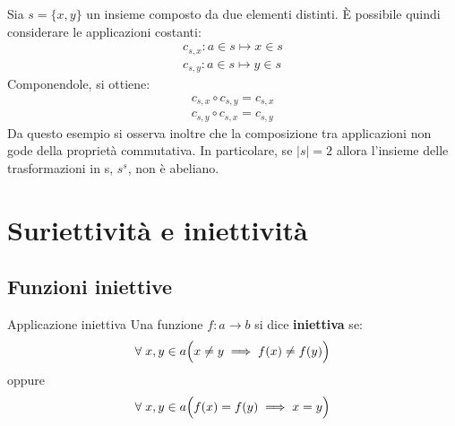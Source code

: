 \begin{osservation}\label{osservation:non_commutativity_composition}
	Sia $s=\{x,y\}$ un insieme composto da due elementi distinti. È possibile quindi considerare le applicazioni costanti:
	\begin{displaymath}
		\begin{array}{l}
			c_{s,x} : a \in s \mapsto x \in s \\
			c_{s,y} : a \in s \mapsto y \in s
		\end{array}
	\end{displaymath}
	Componendole, si ottiene:
	\begin{displaymath}
		\begin{array}{l}
			c_{s,x} \circ c_{s,y} = c_{s,x} \\
			c_{s,y} \circ c_{s,x} = c_{s,y}
		\end{array}
	\end{displaymath}
	Da questo esempio si osserva inoltre che la composizione tra applicazioni non gode della proprietà commutativa. In particolare, se $|s|=2$ allora l'insieme delle trasformazioni in s, $s^{s}$, non è abeliano.
\end{osservation}

\section{Suriettività e iniettività}
\subsection{Funzioni iniettive}
\begin{defbox}{Applicazione iniettiva}
	Una funzione $f:a \rightarrow b$ si dice \textbf{iniettiva} se:
	\begin{equation}
		\forall \; x,y \in a \Bigl( x \neq y \implies f(x) \neq f(y) \Bigr)
	\end{equation}
	oppure
	\begin{equation}
		\forall \; x,y \in a \Bigl(f(x) = f(y) \implies x=y \Bigr)
	\end{equation}
\end{defbox}


